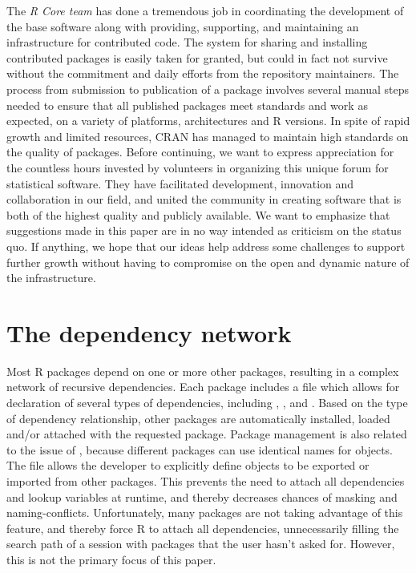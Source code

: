 The \emph{R Core team} has done a tremendous job in coordinating the
development of the base software along with providing, supporting, and maintaining an
infrastructure for contributed code. The system for sharing and installing
contributed packages is easily taken for granted, but could in fact not
survive without the commitment and daily efforts from the repository
maintainers. The process from submission to publication of a package involves
several manual steps needed to ensure that all published packages
meet standards and work as expected, on a variety of platforms, architectures
and R versions. In spite of rapid growth and limited resources, CRAN has
managed to maintain high standards on the quality of packages. Before
continuing, we want to express appreciation for the countless hours invested
by volunteers in organizing this unique forum for statistical software.
They have facilitated development, innovation and collaboration in our field,
and united the community in creating software that is both of the highest
quality and publicly available. We want to emphasize that suggestions made in
this paper are in no way intended as criticism on the status quo. If anything,
we hope that our ideas help address some challenges to support further growth
without having to compromise on the open and dynamic nature of the
infrastructure.

\section{The dependency network}

Most R packages depend on one or more other packages, resulting in a complex
network of recursive dependencies. Each package includes a 
file which allows for declaration of several types of dependencies, including
, ,  and . Based on
the type of dependency relationship, other packages are automatically
installed, loaded and/or attached with the requested package. Package
management is also related to the issue of , because different
packages can use identical names for objects. The  file allows
the developer to explicitly define objects to be exported or imported from
other packages. This prevents the need to attach all dependencies and lookup
variables at runtime, and thereby decreases chances of masking and
naming-conflicts. Unfortunately, many packages are not taking advantage of this
feature, and thereby force R to attach all dependencies, unnecessarily filling
the search path of a session with packages that the user hasn't asked for.
However, this is not the primary focus of this paper.

